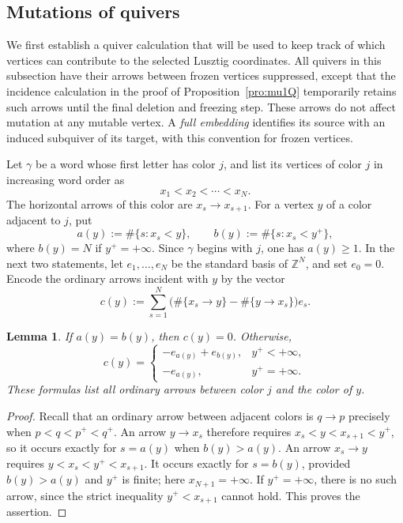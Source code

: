 \documentclass[12pt, reqno]{amsart}
\theoremstyle{plain}
\newtheorem{lemma}[theorem]{Lemma}
\theoremstyle{definition}
\numberwithin{equation}{section}
\begin{document}
\subsection{Mutations of quivers}

We first establish a quiver calculation that will be used to keep track of
which vertices can contribute to the selected Lusztig coordinates. All
quivers in this subsection have their arrows between frozen vertices
suppressed, except that the incidence calculation in the proof of
Proposition~\ref{pro:mu1Q} temporarily retains such arrows until the final
deletion and freezing step. These arrows do not affect mutation at any
mutable vertex. A \emph{full embedding} identifies its source with an induced
subquiver of its target, with this convention for frozen vertices.

Let \(\gamma\) be a word whose first letter has color \(j\), and list its
vertices of color \(j\) in increasing word order as
\[
 x_1<x_2<\cdots<x_N.
\]
The horizontal arrows of this color are \(x_s\to x_{s+1}\).
For a vertex \(y\) of a color adjacent to \(j\), put
\[
 a(y):=\#\{s:x_s<y\},
 \qquad
 b(y):=\#\{s:x_s<y^+\},
\]
where \(b(y)=N\) if \(y^+=+\infty\). Since \(\gamma\) begins with
\(j\), one has \(a(y)\geq1\). In the next two statements, let
\(e_1,\ldots,e_N\) be the standard basis of \(\mathbb Z^N\), and set
\(e_0=0\). Encode the ordinary arrows incident with \(y\) by the vector
\[
 c(y):=\sum_{s=1}^N
 \bigl(\#\{x_s\to y\}-\#\{y\to x_s\}\bigr)e_s.
\]

\begin{lemma}\label{lem:ordinary-arrows-zigzag}
If \(a(y)=b(y)\), then \(c(y)=0\). Otherwise,
\begin{equation}\label{eq:jk-recursion}
 c(y)=
 \begin{cases}
 -e_{a(y)}+e_{b(y)},&y^+<+\infty,\\
 -e_{a(y)},&y^+=+\infty.
 \end{cases}
\end{equation}
These formulas list all ordinary arrows between color \(j\) and the
color of \(y\).
\end{lemma}

\begin{proof}
Recall that an ordinary arrow between adjacent colors is \(q\to p\)
precisely when \(p<q<p^+<q^+\). An arrow \(y\to x_s\) therefore requires
\(x_s<y<x_{s+1}<y^+\), so it occurs exactly for \(s=a(y)\) when
\(b(y)>a(y)\). An arrow \(x_s\to y\) requires
\(y<x_s<y^+<x_{s+1}\). It occurs exactly for \(s=b(y)\), provided
\(b(y)>a(y)\) and \(y^+\) is finite; here \(x_{N+1}=+\infty\).
If \(y^+=+\infty\), there is no such arrow, since the strict inequality
\(y^+<x_{s+1}\) cannot hold. This proves the assertion.
\end{proof}
\end{document}
